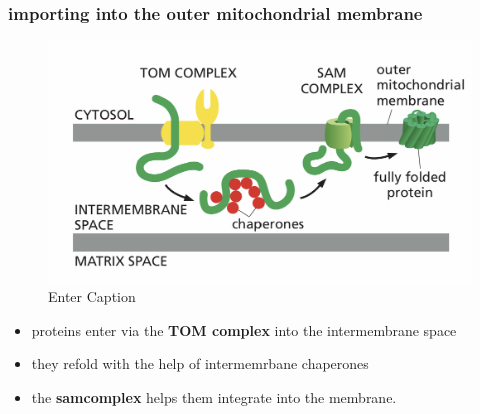 \documentclass[../main.tex]{subfiles}
\begin{document}
\subsubsection{importing into the outer mitochondrial membrane}
\begin{figure}[H]
    \centering
    \includegraphics[width=\linewidth]{outerMembrane.png}
    \caption{Enter Caption}
    \label{fig:enter-label}
\end{figure}
\begin{itemize}
    \item proteins enter via the \textbf{TOM complex} into the intermembrane space
    \item they refold with the help of intermemrbane chaperones
    \item the \textbf{\gls{samcomplex}} helps them integrate into the membrane.
\end{itemize}
\end{document}
